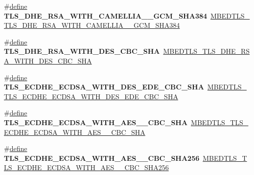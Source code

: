 \begin{DoxyCompactItemize}
\#\hyperlink{structdefine}{define} {\bfseries T\+L\+S\+\_\+\+D\+H\+E\+\_\+\+R\+S\+A\+\_\+\+W\+I\+T\+H\+\_\+\+C\+A\+M\+E\+L\+L\+I\+A\+\_\+\_\+\+G\+C\+M\+\_\+\+S\+H\+A384}~\hyperlink{ssl__ciphersuites_8h_a8aae9417cd05c572ab5c8fc8459f95bc}{M\+B\+E\+D\+T\+L\+S\+\_\+\+T\+L\+S\+\_\+\+D\+H\+E\+\_\+\+R\+S\+A\+\_\+\+W\+I\+T\+H\+\_\+\+C\+A\+M\+E\+L\+L\+I\+A\+\_\+\_\+\+G\+C\+M\+\_\+\+S\+H\+A384}
\item 
\mbox{\label{compat-1_83_8h_a29767f3430ead8364105e7099e846be4}} 
\#\hyperlink{structdefine}{define} {\bfseries T\+L\+S\+\_\+\+D\+H\+E\+\_\+\+R\+S\+A\+\_\+\+W\+I\+T\+H\+\_\+\+D\+E\+S\+\_\+\+C\+B\+C\+\_\+\+S\+HA}~\hyperlink{ssl__ciphersuites_8h_ab15d94b2d3e7a8108970983d58594fa2}{M\+B\+E\+D\+T\+L\+S\+\_\+\+T\+L\+S\+\_\+\+D\+H\+E\+\_\+\+R\+S\+A\+\_\+\+W\+I\+T\+H\+\_\+\+D\+E\+S\+\_\+\+C\+B\+C\+\_\+\+S\+HA}
\item 
\mbox{\label{compat-1_83_8h_a57c9dbc1589e5dc5e2e854e7775d539c}} 
\#\hyperlink{structdefine}{define} {\bfseries T\+L\+S\+\_\+\+E\+C\+D\+H\+E\+\_\+\+E\+C\+D\+S\+A\+\_\+\+W\+I\+T\+H\+\_\+D\+E\+S\+\_\+\+E\+D\+E\+\_\+\+C\+B\+C\+\_\+\+S\+HA}~\hyperlink{ssl__ciphersuites_8h_adefb72a7bd593f894e03d5061a1ffb72}{M\+B\+E\+D\+T\+L\+S\+\_\+\+T\+L\+S\+\_\+\+E\+C\+D\+H\+E\+\_\+\+E\+C\+D\+S\+A\+\_\+\+W\+I\+T\+H\+\_\+D\+E\+S\+\_\+\+E\+D\+E\+\_\+\+C\+B\+C\+\_\+\+S\+HA}
\item 
\mbox{\label{compat-1_83_8h_a5c065d6a1ed19fefcca6bf712188f2ea}} 
\#\hyperlink{structdefine}{define} {\bfseries T\+L\+S\+\_\+\+E\+C\+D\+H\+E\+\_\+\+E\+C\+D\+S\+A\+\_\+\+W\+I\+T\+H\+\_\+\+A\+E\+S\+\_\+\_\+\+C\+B\+C\+\_\+\+S\+HA}~\hyperlink{ssl__ciphersuites_8h_a04628d6486564ca5f6d30f876fec72a9}{M\+B\+E\+D\+T\+L\+S\+\_\+\+T\+L\+S\+\_\+\+E\+C\+D\+H\+E\+\_\+\+E\+C\+D\+S\+A\+\_\+\+W\+I\+T\+H\+\_\+\+A\+E\+S\+\_\+\_\+\+C\+B\+C\+\_\+\+S\+HA}
\item 
\mbox{\label{compat-1_83_8h_a401c11fa2f370f504deb0aaecca8d9ad}} 
\#\hyperlink{structdefine}{define} {\bfseries T\+L\+S\+\_\+\+E\+C\+D\+H\+E\+\_\+\+E\+C\+D\+S\+A\+\_\+\+W\+I\+T\+H\+\_\+\+A\+E\+S\+\_\+\_\+\+C\+B\+C\+\_\+\+S\+H\+A256}~\hyperlink{ssl__ciphersuites_8h_abd3d4b82de52f23d9f852b74b3897cdc}{M\+B\+E\+D\+T\+L\+S\+\_\+\+T\+L\+S\+\_\+\+E\+C\+D\+H\+E\+\_\+\+E\+C\+D\+S\+A\+\_\+\+W\+I\+T\+H\+\_\+\+A\+E\+S\+\_\+\_\+\+C\+B\+C\+\_\+\+S\+H\+A256}

\end{DoxyCompactItemize}
